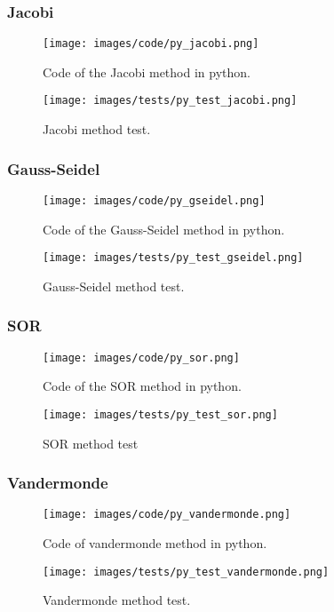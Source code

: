 \documentclass{article}
\begin{document}
\subsubsection{Jacobi}
\begin{figure}[ht]
\centering
\texttt{[image: images/code/py\_jacobi.png]}
\caption{\label{fig:py_secant}Code of the Jacobi method in python.}
\end{figure}
\FloatBarrier
\begin{figure}[ht]
\centering
\texttt{[image: images/tests/py\_test\_jacobi.png]}
\caption{\label{fig:py_gausstot}Jacobi method test.}
\end{figure}
\FloatBarrier

\subsubsection{Gauss-Seidel}
\begin{figure}[ht]
\centering
\texttt{[image: images/code/py\_gseidel.png]}
\caption{\label{fig:py_rootmlt}Code of the Gauss-Seidel method in python.}
\end{figure}
\FloatBarrier
\begin{figure}[ht]
\centering
\texttt{[image: images/tests/py\_test\_gseidel.png]}
\caption{\label{fig:py_rootmlt}Gauss-Seidel method test.}
\end{figure}
\FloatBarrier

\subsubsection{SOR}
\begin{figure}[ht]
\centering
\texttt{[image: images/code/py\_sor.png]}
\caption{\label{fig:py_gausspl}Code of the SOR method in python.}
\end{figure}
\FloatBarrier
\begin{figure}[ht]
\centering
\texttt{[image: images/tests/py\_test\_sor.png]}
\caption{\label{fig:py_gausspl}SOR method test}
\end{figure}
\FloatBarrier

\subsubsection{Vandermonde}
\begin{figure}[ht]
\centering
\texttt{[image: images/code/py\_vandermonde.png]}
\caption{\label{fig:py_gausspar}Code of vandermonde method in python.}
\end{figure}
\FloatBarrier
\begin{figure}[ht]
\centering
\texttt{[image: images/tests/py\_test\_vandermonde.png]}
\caption{\label{fig:py_gausspar}Vandermonde method test.}
\end{figure}
\FloatBarrier
\end{document}
